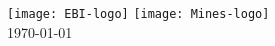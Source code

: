 \documentclass[
11pt, %
openany, %
english, %
singlespacing, %
headsepline, %
]{MastersDoctoralThesis} %
\numberwithin{thm}{chapter}
\numberwithin{lem}{chapter}
\numberwithin{cor}{chapter}
\numberwithin{deftn}{chapter}
\numberwithin{prop}{chapter}
\numberwithin{remark}{chapter}
\numberwithin{example}{chapter}
\numberwithin{con}{chapter}
\begin{document}
\begin{titlepage}
\begin{center}
  \vspace*{0.1\textwidth}
  \groupname\\\deptname\\[2cm] %
   
  \vfill
  \texttt{[image: EBI-logo]}
  \hspace*{0.1\textwidth}
  \texttt{[image: Mines-logo]}\\

  \vspace*{.06\textheight}
  {\large \today}\\[4cm] %
   
  \vfill
  \end{center}
\end{titlepage}

\tableofcontents







\appendix




\nocite{*}
\printbibliography%
\end{document}
